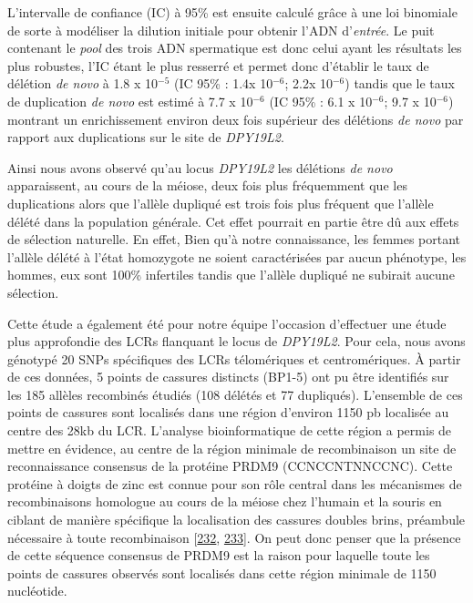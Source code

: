 \documentclass[12pt,a4paper,twoside]{ugathesis}
\theoremstyle{definition}
\theoremstyle{definition}
\theoremstyle{definition}
\theoremstyle{remark}
\begin{document}
L'intervalle de confiance (IC) à 95\% est ensuite calculé grâce à une
loi binomiale de sorte à modéliser la dilution initiale pour obtenir
l'ADN d'\emph{entrée}. Le puit contenant le \emph{pool} des trois ADN
spermatique est donc celui ayant les résultats les plus robustes, l'IC
étant le plus resserré et permet donc d'établir le taux de délétion
\emph{de novo} à 1.8 x 10\(^{-5}\) (IC 95\% : 1.4x 10\(^{-6}\); 2.2x
10\(^{-6}\)) tandis que le taux de duplication \emph{de novo} est estimé
à 7.7 x 10\(^{-6}\) (IC 95\% : 6.1 x 10\(^{-6}\); 9.7 x 10\(^{-6}\))
montrant un enrichissement environ deux fois supérieur des délétions
\emph{de novo} par rapport aux duplications sur le site de
\emph{DPY19L2}.

Ainsi nous avons observé qu'au locus \emph{DPY19L2} les délétions
\emph{de novo} apparaissent, au cours de la méiose, deux fois plus
fréquemment que les duplications alors que l'allèle dupliqué est trois
fois plus fréquent que l'allèle délété dans la population générale. Cet
effet pourrait en partie être dû aux effets de sélection naturelle. En
effet, Bien qu'à notre connaissance, les femmes portant l'allèle délété
à l'état homozygote ne soient caractérisées par aucun phénotype, les
hommes, eux sont 100\% infertiles tandis que l'allèle dupliqué ne
subirait aucune sélection.

Cette étude a également été pour notre équipe l'occasion d'effectuer une
étude plus approfondie des LCRs flanquant le locus de \emph{DPY19L2}.
Pour cela, nous avons génotypé 20 SNPs spécifiques des LCRs télomériques
et centromériques. À partir de ces données, 5 points de cassures
distincts (BP1-5) ont pu être identifiés sur les 185 allèles recombinés
étudiés (108 délétés et 77 dupliqués). L'ensemble de ces points de
cassures sont localisés dans une région d'environ 1150 pb localisée au
centre des 28kb du LCR. L'analyse bioinformatique de cette région a
permis de mettre en évidence, au centre de la région minimale de
recombinaison un site de reconnaissance consensus de la protéine PRDM9
(CCNCCNTNNCCNC). Cette protéine à doigts de zinc est connue pour son
rôle central dans les mécanismes de recombinaisons homologue au cours de
la méiose chez l'humain et la souris en ciblant de manière spécifique la
localisation des cassures doubles brins, préambule nécessaire à toute
recombinaison {[}\protect\hyperlink{ref-Parvanov2010}{232},
\protect\hyperlink{ref-Baudat2010}{233}{]}. On peut donc penser que la
présence de cette séquence consensus de PRDM9 est la raison pour
laquelle toute les points de cassures observés sont localisés dans cette
région minimale de 1150 nucléotide.
\end{document}

